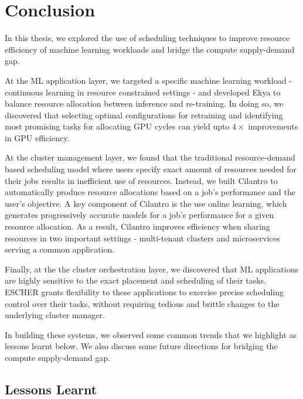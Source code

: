 \chapter{Conclusion}
\label{ch_conclusion}

In this thesis, we explored the use of scheduling techniques to improve resource efficiency of machine learning workloads and bridge the compute supply-demand gap.

At the ML application layer, we targeted a specific machine learning workload - continuous learning in resource constrained settings - and developed Ekya to balance resource allocation between inference and re-training. In doing so, we discovered that selecting optimal configurations for retraining and identifying most promising tasks for allocating GPU cycles can yield upto $4\times$ improvements in GPU efficiency.

At the cluster management layer, we found that the traditional resource-demand based scheduling model where users specify exact amount of resources needed for their jobs results in inefficient use of resources. Instead, we built Cilantro to automatically produce resource allocations based on a job's performance and the user's objective. A key component of Cilantro is the use online learning, which generates progressively accurate models for a job's performance for a given resource allocation. As a result, Cilantro improves efficiency when sharing resources in two important settings - multi-tenant clusters and microservices serving a common application. 

Finally, at the the cluster orchestration layer, we discovered that ML applications are highly sensitive to the exact placement and scheduling of their tasks. ESCHER grants flexibility to these applications to exercise precise scheduling control over their tasks, without requiring tedious and brittle changes to the underlying cluster manager.

In building these systems, we observed some common trends that we highlight as lessons learnt below. We also discuss some future directions for bridging the compute supply-demand gap.

\section{Lessons Learnt}

